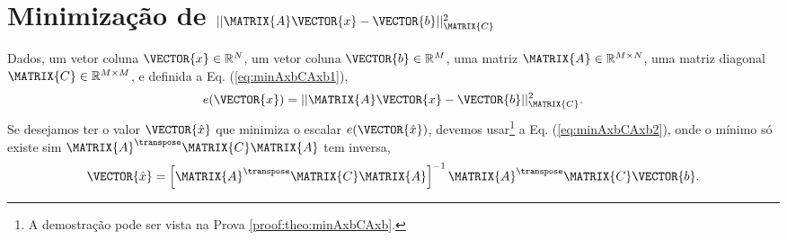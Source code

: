 \section{Minimização de $||\MATRIX{A}\VECTOR{x}-\VECTOR{b}||_{\MATRIX{C}}^2$}
\label{sec:minAxbCAxb}


\begin{theorem}\label{theo:minAxbCAxb}
Dados,
um vetor coluna $\VECTOR{x}\in \mathbb{R}^N$, 
um vetor coluna $\VECTOR{b}\in \mathbb{R}^M$,  
uma matriz $\MATRIX{A} \in \mathbb{R}^{M\times N}$, 
uma matriz diagonal $\MATRIX{C} \in \mathbb{R}^{M\times M}$, e 
definida a Eq. (\ref{eq:minAxbCAxb1}),
\begin{equation}\label{eq:minAxbCAxb1}
e(\VECTOR{x})  = ||\MATRIX{A}\VECTOR{x}-\VECTOR{b}||_{\MATRIX{C}}^2.
\end{equation}
Se desejamos ter o valor $\VECTOR{\hat{x}}$ que minimiza o escalar $e(\VECTOR{\hat{x}})$,
devemos usar\footnote{A demostração pode ser vista na Prova \ref{proof:theo:minAxbCAxb}.} a Eq. (\ref{eq:minAxbCAxb2}),
onde o mínimo só existe sim $\MATRIX{A}^{\transpose}\MATRIX{C} \MATRIX{A}$ tem inversa,
\begin{equation}\label{eq:minAxbCAxb2}
\VECTOR{\hat{x}} =
\left[ \MATRIX{A}^{\transpose}\MATRIX{C} \MATRIX{A} \right]^{-1}\MATRIX{A}^{\transpose}\MATRIX{C}\VECTOR{b}.
\end{equation}

\end{theorem}


